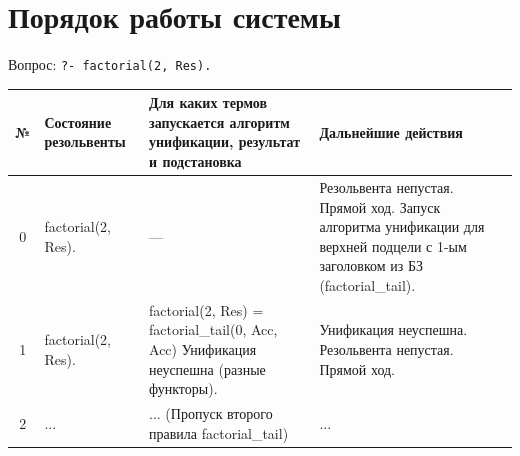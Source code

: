 \clearpage

\section{Порядок работы системы}

Вопрос: \texttt{?- factorial(2, Res).}

\begin{tabularx}{\textwidth}{|c|>{\small}X|>{\small}X|>{\small}X|}
	\hline
	\textbf{№}                                                                         &
	\textbf{Состояние резольвенты}                                                     &
	\textbf{Для каких термов запускается алгоритм унификации, результат и подстановка} &
	\textbf{Дальнейшие действия}                                                               \\
	\hline

	0                                                                                  &
	factorial(2, Res).                                                                 &
	—                                                                                  &
	Резольвента непустая. \newline
	Прямой ход. \newline
	Запуск алгоритма унификации для верхней подцели с 1-ым заголовком из БЗ (factorial\_tail). \\
	\hline

	1                                                                                  &
	factorial(2, Res).                                                                 &
	factorial(2, Res) = \newline
	factorial\_tail(0, Acc, Acc) \newline
	Унификация неуспешна (разные функторы).                                            &
	Унификация неуспешна. \newline
	Резольвента непустая. \newline
	Прямой ход.                                                                                \\
	\hline

	2                                                                                  &
	...                                                                                &
	... (Пропуск второго правила factorial\_tail)                                      &
	...                                                                                        \\
	\hline


\end{tabularx}
